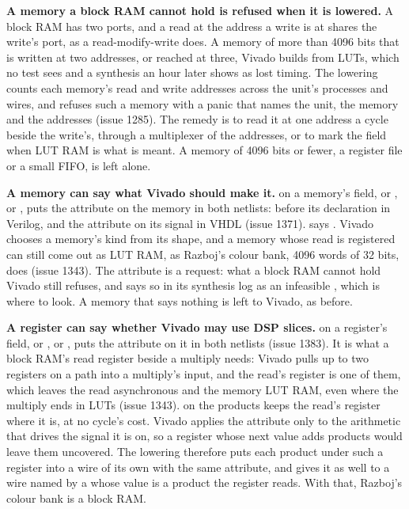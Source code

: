 \textbf{A memory a block RAM cannot hold is refused when it is
lowered.} A block RAM has two ports, and a read at the address a write
is at shares the write's port, as a read-modify-write does. A memory
of more than 4096 bits that is written at two addresses, or reached at
three, Vivado builds from LUTs, which no test sees and a synthesis an
hour later shows as lost timing. The lowering counts each memory's
read and write addresses across the unit's processes and wires, and
refuses such a memory with a panic that names the unit, the memory and
the addresses (issue 1285). The remedy is to read it at one address a
cycle beside the write's, through a multiplexer of the addresses, or
to mark the field \code{\#[distributed]} when LUT RAM is what is
meant. A memory of 4096 bits or fewer, a register file or a small
FIFO, is left alone.

\textbf{A memory can say what Vivado should make it.}
 on a memory's field, or
,  or , puts
the  attribute on the memory in both netlists:
 before its declaration in Verilog,
and the attribute on its signal in VHDL (issue 1371).
\code{\#[distributed]} says . Vivado chooses a
memory's kind from its shape, and a memory whose read is registered
can still come out as LUT RAM, as Razboj's colour bank, 4096 words of
32 bits, does (issue 1343). The attribute is a request: what a block
RAM cannot hold Vivado still refuses, and says so in its synthesis
log as an infeasible , which is where to look. A
memory that says nothing is left to Vivado, as before.

\textbf{A register can say whether Vivado may use DSP slices.}
 on a register's field, or ,
 or , puts the  attribute
on it in both netlists (issue 1383). It is what a block RAM's read
register beside a multiply needs: Vivado pulls up to two registers on
a path into a multiply's input, and the read's register is one of
them, which leaves the read asynchronous and the memory LUT RAM, even
where the multiply ends in LUTs (issue 1343).  on the
products keeps the read's register where it is, at no cycle's cost.
Vivado applies the attribute only to the arithmetic that drives the
signal it is on, so a register whose next value adds products would
leave them uncovered. The lowering therefore puts each product under
such a register into a wire of its own with the same attribute, and
gives it as well to a wire named by a  whose value is a
product the register reads. With that, Razboj's colour bank is a
block RAM.

